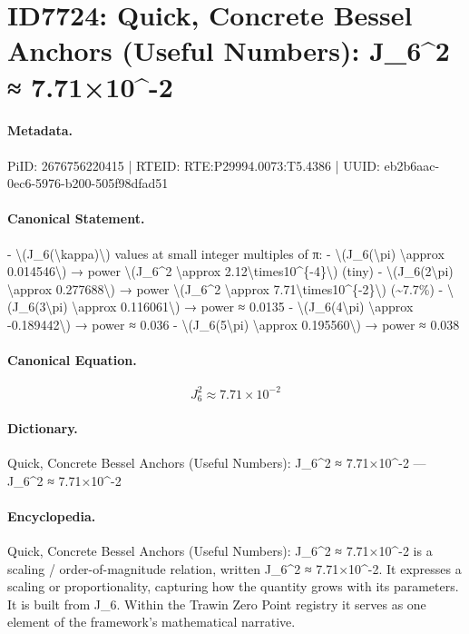 \section*{ID7724: Quick, Concrete Bessel Anchors (Useful Numbers): J\_6\textasciicircum{}2 ≈ 7.71×10\textasciicircum{}-2}
\paragraph{Metadata.}
PiID: 2676756220415 | RTEID: RTE:P29994.0073:T5.4386 | UUID: eb2b6aac-0ec6-5976-b200-505f98dfad51

\paragraph{Canonical Statement.}
- \textbackslash{}(J\_6(\textbackslash{}kappa)\textbackslash{}) values at small integer multiples of π: - \textbackslash{}(J\_6(\textbackslash{}pi) \textbackslash{}approx 0.014546\textbackslash{}) → power \textbackslash{}(J\_6\textasciicircum{}2 \textbackslash{}approx 2.12\textbackslash{}times10\textasciicircum{}\{-4\}\textbackslash{}) (tiny) - \textbackslash{}(J\_6(2\textbackslash{}pi) \textbackslash{}approx 0.277688\textbackslash{}) → power \textbackslash{}(J\_6\textasciicircum{}2 \textbackslash{}approx 7.71\textbackslash{}times10\textasciicircum{}\{-2\}\textbackslash{}) (\textasciitilde{}7.7\%) - \textbackslash{}(J\_6(3\textbackslash{}pi) \textbackslash{}approx 0.116061\textbackslash{}) → power ≈ 0.0135 - \textbackslash{}(J\_6(4\textbackslash{}pi) \textbackslash{}approx -0.189442\textbackslash{}) → power ≈ 0.036 - \textbackslash{}(J\_6(5\textbackslash{}pi) \textbackslash{}approx 0.195560\textbackslash{}) → power ≈ 0.038

\paragraph{Canonical Equation.}
\[
J_6^2 \approx 7.71\times10^{-2}
\]

\paragraph{Dictionary.}
Quick, Concrete Bessel Anchors (Useful Numbers): J\_6\textasciicircum{}2 ≈ 7.71×10\textasciicircum{}-2 — J\_6\textasciicircum{}2 ≈ 7.71×10\textasciicircum{}-2

\paragraph{Encyclopedia.}
Quick, Concrete Bessel Anchors (Useful Numbers): J\_6\textasciicircum{}2 ≈ 7.71×10\textasciicircum{}-2 is a scaling / order-of-magnitude relation, written J\_6\textasciicircum{}2 ≈ 7.71×10\textasciicircum{}-2. It expresses a scaling or proportionality, capturing how the quantity grows with its parameters. It is built from J\_6. Within the Trawin Zero Point registry it serves as one element of the framework's mathematical narrative.
